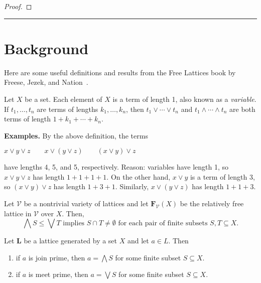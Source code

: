 {\begin{proof}
\end{proof}

\bigskip


\bigskip
\hrule
\bigskip

  \appendix

\section{Background}
Here are some useful definitions and results from the Free Lattices book by Freese, Jezek, and Nation~\cite{MR1319815}.

\begin{definition} Let $X$ be a set. Each element of $X$ is a term of length 1, also known as a \emph{variable}. If $t_1, \dots, t_n$ are terms of 
lengths $k_1, \dots, k_n$, then $t_1 \vee \cdots \vee t_n$ and 
$t_1 \wedge \cdots \wedge t_n$ are both terms of length $1+ k_1 + \cdots + k_n$.
\end{definition}

{\bf Examples.} By the above definition, the terms 

$x \vee y \vee z \qquad x \vee (y \vee z) \qquad (x \vee y) \vee z$

have lengths 4, 5, and 5, respectively. Reason: variables have length 1, so $x \vee y \vee z$ has length $1 + 1 + 1 + 1$.  On the other hand, $x\vee y$ is a term of length $3$, so $(x \vee y) \vee z$ has length $1 + 3 + 1$. Similarly, 
$x \vee (y \vee z)$ has length $1 + 1 + 3$.

\begin{lemma}
Let $\mathcal{V}$ be a nontrivial variety of lattices and let $\mathbf{F}_{\mathcal V}(X)$ be the relatively free lattice in $\mathcal V$ over $X$.  Then,
\begin{equation}
  \label{eq:star2}
\bigwedge S \leqslant \bigvee T \text{ implies }S \cap T \neq \emptyset
\text{ for each pair of finite subsets $S, T \subseteq X$.}
\end{equation}
\end{lemma}

\begin{lemma}
Let $\mathbf L$ be a lattice generated by a set $X$ and let $a \in L$.  Then 
\begin{enumerate}
\item 
if $a$ is join prime, then $a = \bigwedge S$ for some finite subset $S \subseteq X$.
\item if $a$ is meet prime, then $a = \bigvee S$ for some finite subset $S \subseteq X$.


\end{enumerate}
\end{lemma}}
